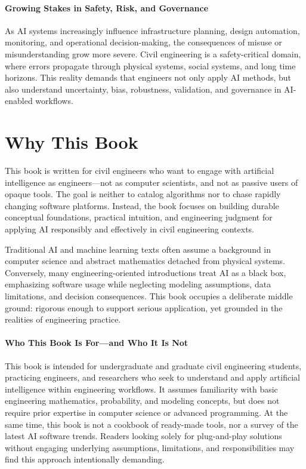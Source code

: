 \documentclass[12pt]{article}
\begin{document}
\paragraph{Growing Stakes in Safety, Risk, and Governance}
As AI systems increasingly influence infrastructure planning, design automation, monitoring, and operational decision-making, the consequences of misuse or misunderstanding grow more severe. Civil engineering is a safety-critical domain, where errors propagate through physical systems, social systems, and long time horizons. This reality demands that engineers not only apply AI methods, but also understand uncertainty, bias, robustness, validation, and governance in AI-enabled workflows.

\section*{Why This Book}

This book is written for civil engineers who want to engage with artificial intelligence as engineers—not as computer scientists, and not as passive users of opaque tools. The goal is neither to catalog algorithms nor to chase rapidly changing software platforms. Instead, the book focuses on building durable conceptual foundations, practical intuition, and engineering judgment for applying AI responsibly and effectively in civil engineering contexts.

Traditional AI and machine learning texts often assume a background in computer science and abstract mathematics detached from physical systems. Conversely, many engineering-oriented introductions treat AI as a black box, emphasizing software usage while neglecting modeling assumptions, data limitations, and decision consequences. This book occupies a deliberate middle ground: rigorous enough to support serious application, yet grounded in the realities of engineering practice.

\paragraph{Who This Book Is For—and Who It Is Not}
This book is intended for undergraduate and graduate civil engineering students, practicing engineers, and researchers who seek to understand and apply artificial intelligence within engineering workflows. It assumes familiarity with basic engineering mathematics, probability, and modeling concepts, but does not require prior expertise in computer science or advanced programming. At the same time, this book is not a cookbook of ready-made tools, nor a survey of the latest AI software trends. Readers looking solely for plug-and-play solutions without engaging underlying assumptions, limitations, and responsibilities may find this approach intentionally demanding.
\end{document}
